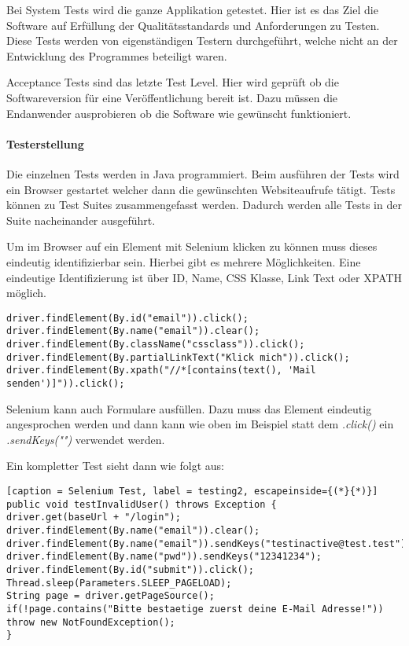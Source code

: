 \newpage

Bei System Tests wird die ganze Applikation getestet. Hier ist es das Ziel die Software auf  Erfüllung der Qualitätsstandards und Anforderungen zu Testen. Diese Tests werden von eigenständigen Testern durchgeführt, welche nicht an der Entwicklung des Programmes beteiligt waren. \cite{TESTING3}

Acceptance Tests sind das letzte Test Level. Hier wird geprüft ob die Softwareversion für eine Veröffentlichung bereit ist. Dazu müssen die Endanwender ausprobieren ob die Software wie gewünscht funktioniert. \cite{TESTING3}

\paragraph{Testerstellung}
Die einzelnen Tests werden in Java programmiert. Beim ausführen der Tests wird ein Browser gestartet welcher dann die gewünschten Websiteaufrufe tätigt. Tests können zu Test Suites zusammengefasst werden. Dadurch werden alle Tests in der Suite nacheinander ausgeführt. 

Um im Browser auf ein Element mit Selenium klicken zu können muss dieses eindeutig identifizierbar sein. Hierbei gibt es mehrere Möglichkeiten. Eine eindeutige Identifizierung ist über ID, Name, CSS Klasse, Link Text oder XPATH möglich. 

\begin{lstlisting}[caption = Selenium Element Selektoren, label = testing1]
driver.findElement(By.id("email")).click();
driver.findElement(By.name("email")).clear();
driver.findElement(By.className("cssclass")).click();
driver.findElement(By.partialLinkText("Klick mich")).click();
driver.findElement(By.xpath("//*[contains(text(), 'Mail senden')]")).click();
\end{lstlisting}

Selenium kann auch Formulare ausfüllen. Dazu muss das Element eindeutig angesprochen werden und dann kann wie oben im Beispiel statt dem \textit{.click()} ein \textit{.sendKeys("")} verwendet werden. 

\newpage

Ein kompletter Test sieht dann wie folgt aus:
\begin{lstlisting}[caption = Selenium Test, label = testing2, escapeinside={(*}{*)}]
public void testInvalidUser() throws Exception {
driver.get(baseUrl + "/login");
driver.findElement(By.name("email")).clear();
driver.findElement(By.name("email")).sendKeys("testinactive@test.test");
driver.findElement(By.name("pwd")).sendKeys("12341234");
driver.findElement(By.id("submit")).click();
Thread.sleep(Parameters.SLEEP_PAGELOAD);
String page = driver.getPageSource();
if(!page.contains("Bitte bestaetige zuerst deine E-Mail Adresse!")) throw new NotFoundException();
}
\end{lstlisting}

